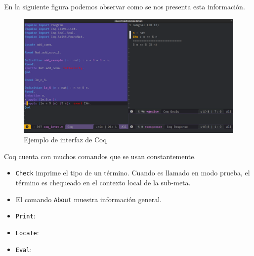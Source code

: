 En la siguiente figura podemos observar como se nos presenta esta información.

\begin{figure}[h]
  \centering
  \includegraphics[width=1\textwidth]{gfx/coq_emacs_example.png}
  \caption{Ejemplo de interfaz de Coq}
  \label{fig:ui}
\end{figure}

Coq cuenta con muchos comandos que se usan constantemente.
\begin{itemize}
  \item \lstinline{Check} imprime el tipo de un término. Cuando es llamado en modo prueba, el término es chequeado en el contexto local de la sub-meta.
  \item El comando \lstinline{About} muestra información general.
  \item \lstinline{Print}:
  \item \lstinline{Locate}:
  \item \lstinline{Eval}:
\end{itemize}